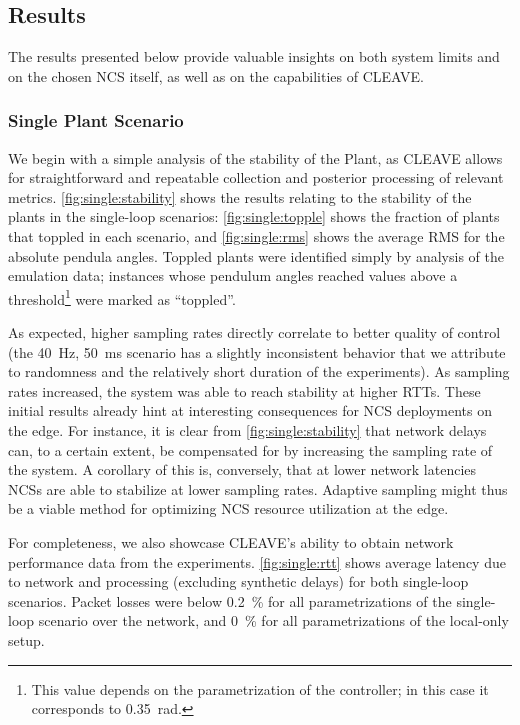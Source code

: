 \subsection{Results}\label{ssec:results}

The results presented below provide valuable insights on both system limits and on the chosen \ac{NCS} itself, as well as on the capabilities of \ac{CLEAVE}.

\subsubsection{Single Plant Scenario}

We begin with a simple analysis of the stability of the Plant, as \ac{CLEAVE} allows for straightforward and repeatable collection and posterior processing of relevant metrics.  
\cref{fig:single:stability} shows the results relating to the stability of the plants in the single-loop scenarios:
\cref{fig:single:topple} shows the fraction of plants that toppled in each scenario, and \cref{fig:single:rms} shows the average \ac{RMS} for the absolute pendula angles.
Toppled plants were identified simply by analysis of the emulation data; instances whose pendulum angles reached values above a threshold\footnote{This value depends on the parametrization of the controller; in this case it corresponds to \SI{0.35}{\radian}.} were marked as ``toppled''.

As expected, higher sampling rates directly correlate to better quality of control (the \SI{40}{\hertz}, \SI{50}{\milli\second} scenario has a slightly inconsistent behavior that we attribute to randomness and the relatively short duration of the experiments).
As sampling rates increased, the system was able to reach stability at higher \acp{RTT}.
These initial results already hint at interesting consequences for \ac{NCS} deployments on the edge.
For instance, it is clear from \cref{fig:single:stability} that network delays can, to a certain extent, be compensated for by increasing the sampling rate of the system.
A corollary of this is, conversely, that at lower network latencies \acp{NCS} are able to stabilize at lower sampling rates.
Adaptive sampling might thus be a viable method for optimizing \ac{NCS} resource utilization at the edge.

For completeness, we also showcase \ac{CLEAVE}'s ability to obtain network performance data from the experiments.
\cref{fig:single:rtt} shows average latency due to network and processing (excluding synthetic delays) for both single-loop scenarios.
Packet losses were below \SI{0.2}{\percent} for all parametrizations of the single-loop scenario over the network, and \SI{0}{\percent} for all parametrizations of the local-only setup.

